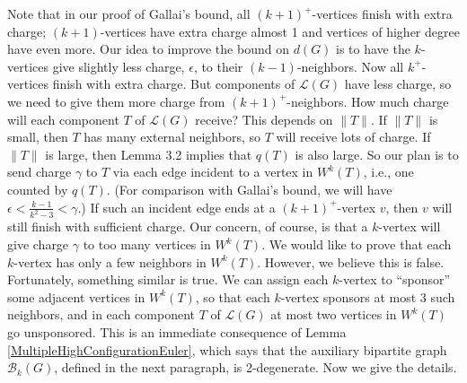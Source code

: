 \documentclass[12pt]{article}
\theoremstyle{plain}
\theoremstyle{definition}
\theoremstyle{remark}
\newcommand{\fancy}[1]{\mathcal{#1}}
\newcommand{\B}{\fancy{B}}
\renewcommand{\L}{\fancy{L}}
\begin{document}
Note that in our proof of Gallai's bound, all $(k+1)^+$-vertices finish with
extra charge; $(k+1)$-vertices have extra charge almost 1 and vertices of
higher degree have even more.  Our idea to improve the bound on $d(G)$ is to
have the $k$-vertices give slightly less charge, $\epsilon$, to their
$(k-1)$-neighbors.  Now all $k^+$-vertices finish with extra charge.  But
components of $\L(G)$ have less charge, so we need to give them more charge
from $(k+1)^+$-neighbors.  How much charge will each component $T$ of $\L(G)$
receive? This depends on $\|T\|$.  If $\|T\|$ is small, then $T$ has many
external neighbors, so $T$ will receive lots of charge.  If $\|T\|$ is large,
then Lemma 3.2 implies that $q(T)$ is also large.  So our plan is to send
charge $\gamma$ to $T$ via each edge incident to a vertex in $W^k(T)$, i.e.,
one counted by $q(T)$.  (For comparison with Gallai's bound, we will have
$\epsilon < \frac{k-1}{k^2-3} < \gamma$.)  If such an incident edge ends at a
$(k+1)^+$-vertex $v$, then $v$ will still finish with sufficient charge.  Our
concern, of course, is that a $k$-vertex will give charge $\gamma$ to too many
vertices in $W^k(T)$.  We would like to prove that each $k$-vertex has only a
few neighbors in $W^k(T)$.  However, we believe this is false. Fortunately,
something similar is true.  We can assign each $k$-vertex to ``sponsor'' some
adjacent vertices in $W^k(T)$, so that each
$k$-vertex sponsors at most 3 such neighbors, and in each component $T$ of
$\L(G)$ at most two vertices in $W^k(T)$ go unsponsored.  This is an
immediate consequence of Lemma \ref{MultipleHighConfigurationEuler}, which says
that the auxiliary bipartite graph $\B_k(G)$, defined in 
the next paragraph, is 2-degenerate.  Now we give the details.
\end{document}
